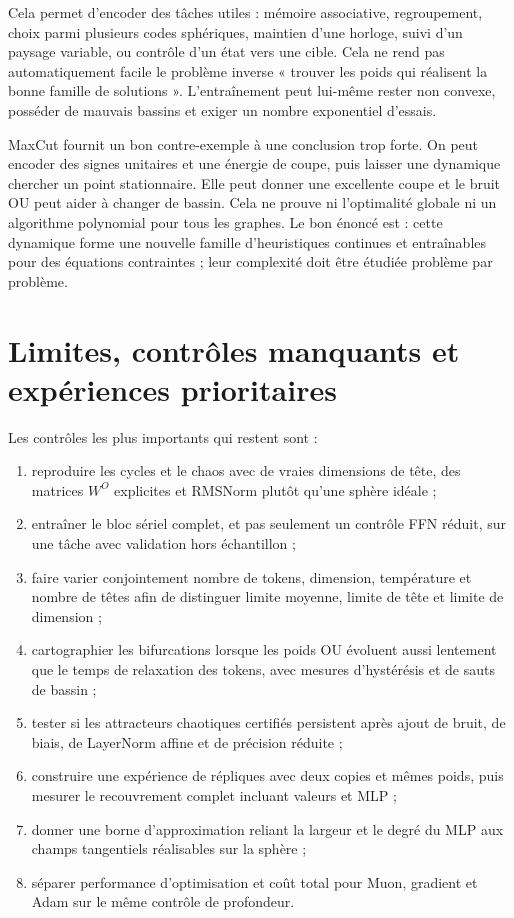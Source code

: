 \documentclass[11pt,a4paper]{article}
\theoremstyle{definition}
\begin{document}
Cela permet d'encoder des tâches utiles : mémoire associative, regroupement, choix
parmi plusieurs codes sphériques, maintien d'une horloge, suivi d'un paysage variable,
ou contrôle d'un état vers une cible. Cela ne rend pas automatiquement facile le
problème inverse « trouver les poids qui réalisent la bonne famille de solutions ».
L'entraînement peut lui-même rester non convexe, posséder de mauvais bassins et exiger
un nombre exponentiel d'essais.

MaxCut fournit un bon contre-exemple à une conclusion trop forte. On peut encoder des
signes unitaires et une énergie de coupe, puis laisser une dynamique chercher un point
stationnaire. Elle peut donner une excellente coupe et le bruit OU peut aider à changer
de bassin. Cela ne prouve ni l'optimalité globale ni un algorithme polynomial pour tous
les graphes. Le bon énoncé est : cette dynamique forme une nouvelle famille
d'heuristiques continues et entraînables pour des équations contraintes ; leur
complexité doit être étudiée problème par problème.

\section{Limites, contrôles manquants et expériences prioritaires}
\label{sec:limits}

Les contrôles les plus importants qui restent sont :

\begin{enumerate}
  \item reproduire les cycles et le chaos avec de vraies dimensions de tête, des
  matrices $W^O$ explicites et RMSNorm plutôt qu'une sphère idéale ;
  \item entraîner le bloc sériel complet, et pas seulement un contrôle FFN réduit, sur
  une tâche avec validation hors échantillon ;
  \item faire varier conjointement nombre de tokens, dimension, température et nombre
  de têtes afin de distinguer limite moyenne, limite de tête et limite de dimension ;
  \item cartographier les bifurcations lorsque les poids OU évoluent aussi lentement que
  le temps de relaxation des tokens, avec mesures d'hystérésis et de sauts de bassin ;
  \item tester si les attracteurs chaotiques certifiés persistent après ajout de bruit,
  de biais, de LayerNorm affine et de précision réduite ;
  \item construire une expérience de répliques avec deux copies et mêmes poids, puis
  mesurer le recouvrement complet incluant valeurs et MLP ;
  \item donner une borne d'approximation reliant la largeur et le degré du MLP aux
  champs tangentiels réalisables sur la sphère ;
  \item séparer performance d'optimisation et coût total pour Muon, gradient et Adam
  sur le même contrôle de profondeur.
\end{enumerate}
\end{document}
